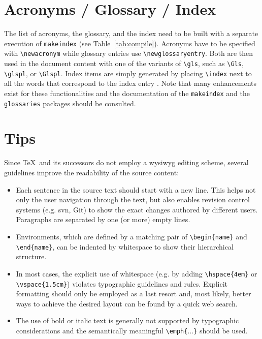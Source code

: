 \section{Acronyms / Glossary / Index}

The list of acronyms, the glossary, and the index need to be built with a separate execution of \verb|makeindex| (see Table~\ref{tab:compile}).
Acronyms have to be specified with \verb|\newacronym| while glossary entries use \verb|\newglossaryentry|.
Both are then used in the document content with one of the variants of \verb|\gls|, such as \verb|\Gls|, \verb|\glspl|, or \verb|\Glspl|.
Index items are simply generated by placing \verb|\index| next to all the words that correspond to the index entry .
Note that many enhancements exist for these functionalities and the documentation of the \verb|makeindex| and the \verb|glossaries| packages should be consulted.


\section{Tips}

Since \TeX\ and its successors do not employ a \gls{wysiwyg} editing scheme, several guidelines improve the readability of the source content:
\begin{itemize}
    \item Each sentence in the source text should start with a new line.
    This helps not only the user navigation through the text, but also enables revision control systems (e.g. \gls{svn}, Git) to show the exact changes authored by different users.
    Paragraphs are separated by one (or more) empty lines.
    \item Environments, which are defined by a matching pair of \verb|\begin{name}| and \verb|\end{name}|, can be indented by whitespace to show their hierarchical structure.
    \item In most cases, the explicit use of whitespace (e.g. by adding \verb|\hspace{4em}| or \verb|\vspace{1.5cm}|) violates typographic guidelines and rules.
    Explicit formatting should only be employed as a last resort and, most likely, better ways to achieve the desired layout can be found by a quick web search.
    \item The use of bold or italic text is generally not supported by typographic considerations and the semantically meaningful \verb|\emph{|\texttt{$\dots$}\verb|}| should be used.
\end{itemize}

